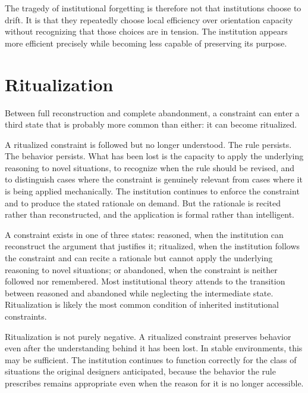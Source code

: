 The tragedy of institutional forgetting is therefore not that institutions
choose to drift. It is that they repeatedly choose local efficiency over
orientation capacity without recognizing that those choices are in tension.
The institution appears more efficient precisely while becoming less capable
of preserving its purpose.

\section{Ritualization}

Between full reconstruction and complete abandonment, a constraint can enter
a third state that is probably more common than either: it can become ritualized.

A ritualized constraint is followed but no longer understood. The rule
persists. The behavior persists. What has been lost is the capacity to apply
the underlying reasoning to novel situations, to recognize when the rule
should be revised, and to distinguish cases where the constraint is genuinely
relevant from cases where it is being applied mechanically. The institution
continues to enforce the constraint and to produce the stated rationale on
demand. But the rationale is recited rather than reconstructed, and the
application is formal rather than intelligent.

\begin{observation}
A constraint exists in one of three states: reasoned, when the institution
can reconstruct the argument that justifies it; ritualized, when the
institution follows the constraint and can recite a rationale but cannot
apply the underlying reasoning to novel situations; or abandoned, when the
constraint is neither followed nor remembered. Most institutional theory
attends to the transition between reasoned and abandoned while neglecting
the intermediate state. Ritualization is likely the most common condition
of inherited institutional constraints.
\end{observation}

Ritualization is not purely negative. A ritualized constraint preserves
behavior even after the understanding behind it has been lost. In stable
environments, this may be sufficient. The institution continues to function
correctly for the class of situations the original designers anticipated,
because the behavior the rule prescribes remains appropriate even when the
reason for it is no longer accessible.

